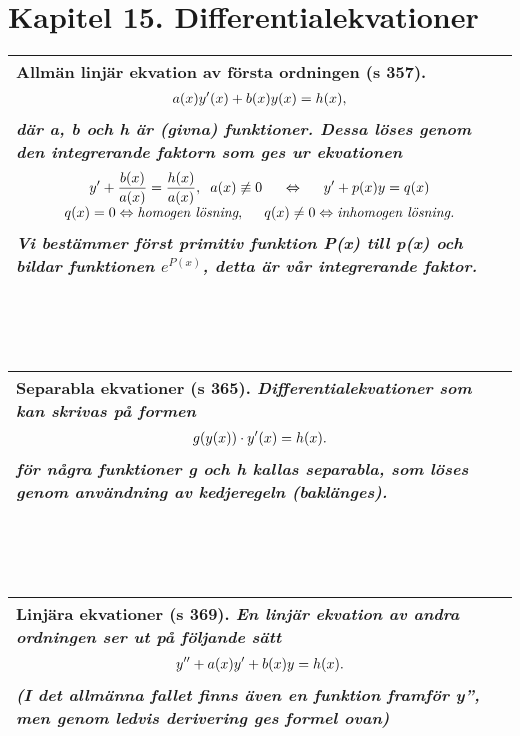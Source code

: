 \documentclass[a4paper]{article}
\begin{document}
\section*{Kapitel 15. Differentialekvationer}
\begin{tabular}{|L{11.5cm}|} \hline
\textbf{Allmän linjär ekvation av första ordningen} (s 357).
\begin{equation*}
\begin{array}{>{\displaystyle}c}
a(x)y'(x)+b(x)y(x)=h(x),
\end{array}
\end{equation*}
\textit{där a, b och h är (givna) funktioner. Dessa löses genom den \textbf{integrerande faktorn} som ges ur ekvationen}
\begin{equation*}
\begin{array}{>{\displaystyle}c}
y'+\frac{b(x)}{a(x)}=\frac{h(x)}{a(x)}, \hspace{0.2cm} a(x)\not\equiv 0 \hspace{0.5cm}\Leftrightarrow \hspace{0.5cm} y'+p(x)y=q(x) \\
q(x)=0 \Leftrightarrow \textit{homogen lösning}, \hspace{0.5cm} q(x)\neq 0 \Leftrightarrow \textit{inhomogen lösning.}
\end{array}
\end{equation*}
\textit{Vi bestämmer först primitiv funktion P(x) till p(x) och bildar funktionen $e^{P(x)}$, detta är vår integrerande faktor.}
\\\hline
\end{tabular}
\\\\\\
\begin{tabular}{|L{11.5cm}|} \hline
\textbf{Separabla ekvationer} (s 365). \textit{Differentialekvationer som kan skrivas på formen}
\begin{equation*}
\begin{array}{>{\displaystyle}c}
g(y(x))\cdot y'(x)=h(x).
\end{array}
\end{equation*}
\textit{för några funktioner g och h kallas \textbf{separabla}, som löses genom användning av kedjeregeln (baklänges).}
\\\hline
\end{tabular}
\\\\\\
\begin{tabular}{|L{11.5cm}|} \hline
\textbf{Linjära ekvationer} (s 369). \textit{En \textbf{linjär ekvation av andra ordningen} ser ut på följande sätt}
\begin{equation*}
\begin{array}{>{\displaystyle}c}
y''+a(x)y'+b(x)y=h(x).
\end{array}
\end{equation*}
\textit{(I det allmänna fallet finns även en funktion framför y'', men genom ledvis derivering ges formel ovan)}
\\\hline
\end{tabular}
\end{document}
